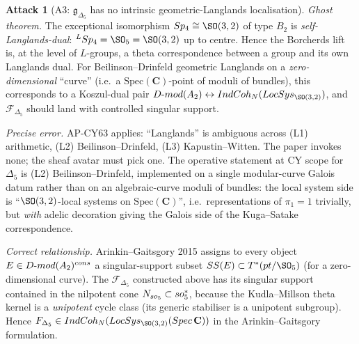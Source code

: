 \documentclass[11pt]{amsart}
\theoremstyle{definition}
\newtheorem{attack}{Attack}
\providecommand{\IndCoh}{\mathrm{IndCoh}}
\providecommand{\DMod}{D\text{-}\mathrm{mod}}
\providecommand{\LocSys}{\mathrm{LocSys}}
\providecommand{\Sp}{\mathrm{Sp}}
\providecommand{\fso}{\mathfrak{so}}
\providecommand{\cF}{\mathcal{F}}
\providecommand{\bC}{\mathbf{C}}
\providecommand{\Dfive}{\Delta_5}
\providecommand{\gDfive}{\mathfrak{g}_{\Dfive}}
\providecommand{\SingSupp}{\mathrm{SS}}
\begin{document}
\begin{attack}[A3: $\gDfive$ has no intrinsic geometric-Langlands
localisation]\leavevmode

\noindent\emph{Ghost theorem.} The exceptional isomorphism
$\Sp_4 \cong \SO(3,2)$ of type $B_2$ is \emph{self-Langlands-dual}:
${}^L\Sp_4 = \SO_5 = \SO(3,2)$ up to centre. Hence the Borcherds lift
is, at the level of $L$-groups, a theta correspondence between a group
and its own Langlands dual. For Beilinson--Drinfeld geometric
Langlands on a \emph{zero-dimensional} ``curve'' (i.e.\ a
$\mathrm{Spec}(\bC)$-point of moduli of bundles), this corresponds to
a Koszul-dual pair
$\DMod(\mathcal{A}_2) \leftrightarrow
\IndCoh_{\cN}(\LocSys_{\SO(3,2)})$, and $\cF_{\Dfive}$ should land
with controlled singular support.

\noindent\emph{Precise error.} AP-CY63 applies: ``Langlands'' is
ambiguous across (L1) arithmetic, (L2) Beilinson--Drinfeld,
(L3) Kapustin--Witten. The paper invokes none; the sheaf avatar
must pick one. The operative statement at CY scope for $\Dfive$ is
(L2) Beilinson--Drinfeld, implemented on a single modular-curve
Galois datum rather than on an algebraic-curve moduli of bundles: the
local system side is ``$\SO(3,2)$-local systems on
$\mathrm{Spec}(\bC)$'', i.e.\ representations of $\pi_1 = 1$ trivially,
but \emph{with} adelic decoration giving the Galois side of the
Kuga--Satake correspondence.

\noindent\emph{Correct relationship.} Arinkin--Gaitsgory 2015 assigns
to every object $\cE \in \DMod(\mathcal{A}_2)^{\mathrm{cons}}$ a
singular-support subset $\SingSupp(\cE) \subset T^*(\mathrm{pt}/\SO_5)$
(for a zero-dimensional curve). The
$\cF_{\Dfive}$ constructed above has its singular support
contained in the nilpotent cone $\cN_{\fso_5} \subset \fso_5^*$,
because the Kudla--Millson theta kernel is a \emph{unipotent} cycle
class (its generic stabiliser is a unipotent subgroup). Hence
$\cF_{\Dfive} \in \IndCoh_{\cN}(\LocSys_{\SO(3,2)}(\mathrm{Spec}\,\bC))$
in the Arinkin--Gaitsgory formulation.
\end{attack}
\end{document}
